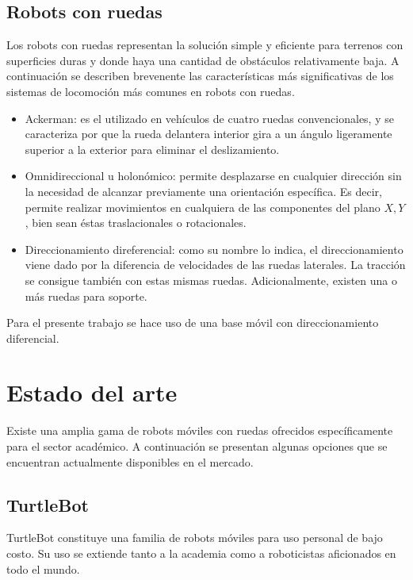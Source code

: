 \subsection{Robots con ruedas}

Los robots con ruedas representan la solución simple y eficiente para terrenos con superficies duras y donde haya una cantidad de obstáculos relativamente baja. A continuación se describen brevenente las características más significativas de los sistemas de locomoción más comunes en robots con ruedas.

\begin{itemize}
	\item Ackerman: es el utilizado en vehículos de cuatro ruedas convencionales, y se caracteriza por que la rueda delantera interior gira a un ángulo ligeramente superior a la exterior para eliminar el deslizamiento.
	\item Omnidireccional u holonómico: permite desplazarse en cualquier dirección sin la necesidad de alcanzar previamente una orientación específica. Es decir, permite realizar movimientos en cualquiera de las componentes del plano $X, Y$, bien sean éstas traslacionales o rotacionales.
	\item Direccionamiento direferencial: como su nombre lo indica, el direccionamiento viene dado por la diferencia de velocidades de las ruedas laterales. La tracción se consigue también con estas mismas ruedas. Adicionalmente, existen una o más ruedas para soporte.
\end{itemize}

Para el presente trabajo se hace uso de una base móvil con direccionamiento diferencial.

\section{Estado del arte}

Existe una amplia gama de robots móviles con ruedas ofrecidos específicamente para el sector académico. A continuación se presentan algunas opciones que se encuentran actualmente disponibles en el mercado.

\subsection{TurtleBot}\label{sec:turtlebot}

TurtleBot constituye una familia de robots móviles para uso personal de bajo costo. Su uso se extiende tanto a la academia como a roboticistas aficionados en todo el mundo.

